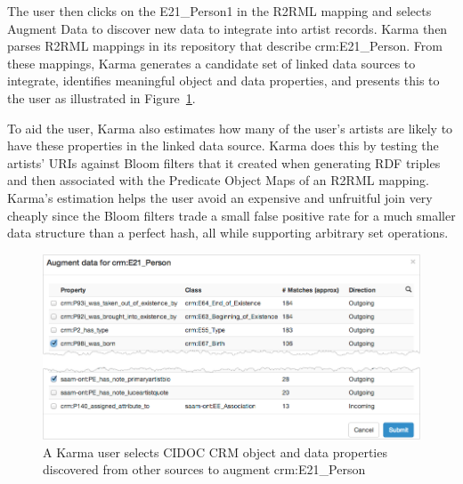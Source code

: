 The user then clicks on the E21\_Person1 in the R2RML mapping and selects Augment Data to discover new data to integrate into artist records.  
Karma then parses R2RML mappings in its repository that describe crm:E21\_Person.
From these mappings, Karma generates a candidate set of linked data sources to integrate, identifies meaningful object and data properties, and presents this to the user as illustrated in Figure~\ref{fig:search-screenshot}.

To aid the user, Karma also estimates how many of the user's artists are likely to have these properties in the linked data source.  
Karma does this by testing the artists' URIs against Bloom filters that it created when generating RDF triples and then associated with the Predicate Object Maps of an R2RML mapping.  
Karma's estimation helps the user avoid an expensive and unfruitful join very cheaply since the Bloom filters trade a small false positive rate for a much smaller data structure than a perfect hash, all while supporting arbitrary set operations.  
\begin{figure}
\centering
\includegraphics[width=4.9in]{images/5-search.png}
\vspace{-5mm}
\caption{A Karma user selects CIDOC CRM object and data properties discovered from other sources to augment crm:E21\_Person}
\vspace{-21pt}
\label{fig:search-screenshot}
\vspace{-1.5em}
\end{figure}